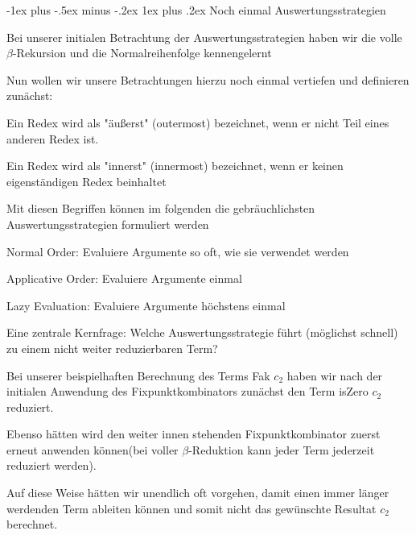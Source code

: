 \documentclass[10pt]{article}
\makeatletter
\renewcommand{\subsubsection}{\@startsection{subsubsection}{3}{0mm}%
                                {-1ex plus -.5ex minus -.2ex}%
                                {1ex plus .2ex}%
                                {\normalfont\small\bfseries}}
\makeatother
\begin{document}
\subsubsection{Noch einmal Auswertungsstrategien}
\begin{itemize*}
  \item Bei unserer initialen Betrachtung der Auswertungsstrategien haben wir die volle $\beta$-Rekursion und die Normalreihenfolge kennengelernt
  \item Nun wollen wir unsere Betrachtungen hierzu noch einmal vertiefen und definieren zunächst:
  \begin{itemize*}
    \item Ein Redex wird als \color{blue} "äußerst" (outermost) \color{black} bezeichnet, wenn er nicht Teil eines anderen Redex ist.
    \item Ein Redex wird als \color{blue} "innerst" (innermost) \color{black} bezeichnet, wenn er keinen eigenständigen Redex beinhaltet
  \end{itemize*}
  \item Mit diesen Begriffen können im folgenden die gebräuchlichsten Auswertungsstrategien formuliert werden
  \begin{itemize*}
    \item \color{blue} Normal Order: \color{black} Evaluiere Argumente so oft, wie sie verwendet werden
    \item \color{blue} Applicative Order: \color{black} Evaluiere Argumente einmal
    \item \color{blue} Lazy Evaluation: \color{black} Evaluiere Argumente höchstens einmal
  \end{itemize*}
  \item Eine zentrale Kernfrage: \color{blue} Welche Auswertungsstrategie führt (möglichst schnell) zu einem nicht weiter reduzierbaren Term?
  \color{black}
  \begin{itemize*}
    \item Bei unserer beispielhaften Berechnung des Terms Fak $c_2$ haben wir nach der initialen Anwendung des Fixpunktkombinators zunächst den Term isZero $c_2$ reduziert.
    \item Ebenso hätten wird den weiter innen stehenden Fixpunktkombinator zuerst erneut anwenden können(bei voller $\beta$-Reduktion kann jeder Term jederzeit reduziert werden).
    \item Auf diese Weise hätten wir unendlich oft vorgehen, damit einen immer länger werdenden Term ableiten können und somit nicht das gewünschte Resultat $c_2$ berechnet.

\end{itemize*}
\end{itemize*}
\end{document}
